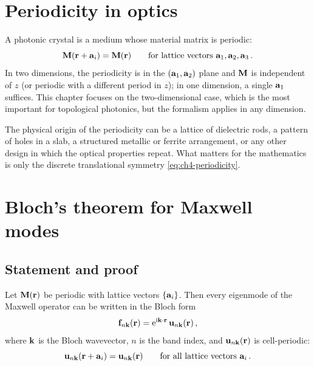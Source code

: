 
\section{Periodicity in optics}
\label{sec:ch4-periodicity}

A photonic crystal is a medium whose material matrix is periodic:
\begin{equation}\label{eq:ch4-periodicity}
  \mathbf{M}(\mathbf{r} + \mathbf{a}_i) = \mathbf{M}(\mathbf{r})
  \qquad\text{for lattice vectors } \mathbf{a}_1, \mathbf{a}_2, \mathbf{a}_3\,.
\end{equation}
In two dimensions, the periodicity is in the $(\mathbf{a}_1,\mathbf{a}_2)$ plane
and $\mathbf{M}$ is independent of $z$ (or periodic with a different period
in $z$); in one dimension, a single $\mathbf{a}_1$ suffices.  This chapter
focuses on the two-dimensional case, which is the most important for
topological photonics, but the formalism applies in any dimension.

The physical origin of the periodicity can be a lattice of dielectric
rods, a pattern of holes in a slab, a structured metallic or ferrite
arrangement, or any other design in which the optical properties repeat.
What matters for the mathematics is only the discrete translational
symmetry \eqref{eq:ch4-periodicity}.

\section{Bloch's theorem for Maxwell modes}
\label{sec:ch4-bloch}

\subsection{Statement and proof}
\label{sec:ch4-bloch-statement}

\begin{theorem}
  \label{thm:ch4-bloch}
  Let $\mathbf{M}(\mathbf{r})$ be periodic with lattice vectors $\{\mathbf{a}_i\}$.
  Then every eigenmode of the Maxwell operator can be written in the
  Bloch form
  \begin{equation}\label{eq:ch4-bloch-form}
    \mathbf{f}_{n\mathbf{k}}(\mathbf{r})
    = \mathrm{e}^{\mathrm{i}\mathbf{k}\cdot\mathbf{r}}\,\mathbf{u}_{n\mathbf{k}}(\mathbf{r})\,,
  \end{equation}
  where $\mathbf{k}$ is the Bloch wavevector, $n$ is the band index, and
  $\mathbf{u}_{n\mathbf{k}}(\mathbf{r})$ is cell-periodic:
  \begin{equation}\label{eq:ch4-cell-periodic}
    \mathbf{u}_{n\mathbf{k}}(\mathbf{r}+\mathbf{a}_i)
    = \mathbf{u}_{n\mathbf{k}}(\mathbf{r})
    \qquad\text{for all lattice vectors } \mathbf{a}_i\,.
  \end{equation}
\end{theorem}

